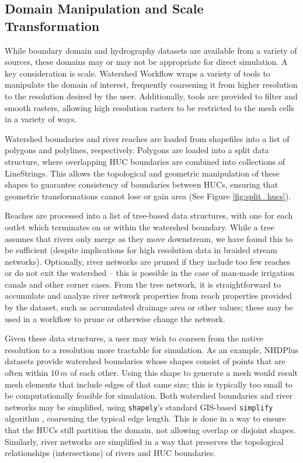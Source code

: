 \documentclass[a4paper,fleqn]{cas-dc}
\newcommand{\code}[1]{\texttt{#1}}
\begin{document}
\subsection{Domain Manipulation and Scale Transformation}
%
While boundary domain and hydrography datasets are available from a variety of sources, these domains may or may not be appropriate for direct simulation.
A key consideration is scale.
Watershed Workflow wraps a variety of tools to manipulate the domain of interest, frequently coarsening it from higher resolution to the resolution desired by the user.
Additionally, tools are provided to filter and smooth rasters, allowing high resolution rasters to be restricted to the mesh cells in a variety of ways.

Watershed boundaries and river reaches are loaded from shapefiles into a list of polygons and polylines, respectively.
Polygons are loaded into a split data structure, where overlapping HUC boundaries are combined into collections of LineStrings.
This allows the topological and geometric manipulation of these shapes to guarantee consistency of boundaries between HUCs, ensuring that geometric transformations cannot lose or gain area (See Figure \ref{fig:split_hucs}).

Reaches are processed into a list of tree-based data structures, with one for each outlet which terminates on or within the watershed boundary.
While a tree assumes that rivers only merge as they move downstream, we have found this to be sufficient (despite implications for high resolution data in braided stream networks).
Optionally, river networks are pruned if they include too few reaches or do not exit the watershed -- this is possible in the case of man-made irrigation canals and other corner cases.
From the tree network, it is straightforward to accumulate and analyze river network properties from reach properties provided by the dataset, such as accumulated drainage area or other values; these may be used in a workflow to prune or otherwise change the network.

Given these data structures, a user may wish to coarsen from the native resolution to a resolution more tractable for simulation.
As an example, NHDPlus datasets provide watershed boundaries whose shapes consist of points that are often within $10\,m$ of each other.
Using this shape to generate a mesh would result mesh elements that include edges of that same size; this is typically too small to be computationally feasible for simulation.
Both watershed boundaries and river networks may be simplified, using \code{shapely}'s standard GIS-based \code{simplify} algorithm \cite{shapely}, coarsening the typical edge length.
This is done in a way to ensure that the HUCs still partition the domain, not allowing overlap or disjoint shapes.
Similarly, river networks are simplified in a way that preserves the topological relationships (intersections) of rivers and HUC boundaries.
\end{document}

